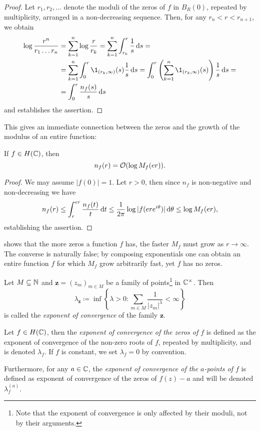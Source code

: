 \begin{proof}
    Let $r_1, r_2, \hdots$ denote the moduli of the zeros of $f$ in $B_{R}(0)$, repeated by multiplicity, arranged in a non-decreasing sequence. Then, for any $r_n < r < r_{n+1}$, we obtain
    \begin{align*}
        \log \frac{r^n}{r_1 \hdots r_n} &= \sum_{k=1}^n \log \frac{r}{r_k} = \sum_{k=1}^n \int_{r_k}^r \frac{1}{s} \diff s = \\
        &= \sum_{k=1}^n \int_0^r \1_{(r_k, \infty)}(s) \frac{1}{s} \diff s = \int_0^r \left( \sum_{k=1}^n \1_{(r_k, \infty)}(s) \right) \frac{1}{s} \diff s = \\
        &= \int_0^r \frac{n_f(s)}{s} \diff s
    \end{align*}
    and  establishes the assertion.
\end{proof}

This gives an immediate connection between the zeros and the growth of the modulus of an entire function:

\begin{lemma} \label{lem:zeros-bounded-by-modulus}
    If $f \in H(\mathbb{C})$, then
    $$ n_f(r) = \mathcal{O}( \log M_f(er) ). $$
\end{lemma}

\begin{proof}
    We may assume $\vert f(0) \vert = 1$. Let $r > 0$, then since $n_f$ is non-negative and non-decreasing we have
    \begin{equation*}
        n_f(r) \leq \int_r^{er} \frac{n_f(t)}{t} \mathop{}\!\mathrm{d} t \leq \frac{1}{2 \pi} \log \vert f(er e^{i \theta}) \vert \mathop{}\!\mathrm{d} \theta \leq \log M_f(er),
    \end{equation*}
    establishing the assertion.
\end{proof}

 shows that the more zeros a function $f$ has, the faster $M_f$ must grow as $r \to \infty$. The converse is naturally false; by composing exponentials one can obtain an entire function $f$ for which $M_f$ grow arbitrarily fast, yet $f$ has no zeros.

\begin{definition} \label{def:zero-exponent}
    Let $M \subseteq \mathbb{N}$ and $\mathbf{z} = (z_m)_{m \in M}$ be a family of points\footnote{Note that the exponent of convergence is only affected by their moduli, not by their arguments.} in $\mathbb{C}^\times$. Then
    $$ \lambda_{\mathbf{z}} \coloneqq \inf \left\{ \lambda > 0 : \sum_{m \in M} \frac{1}{\vert z_m \vert^\lambda} < \infty \right\} $$
    is called the \emph{exponent of convergence} of the family $\mathbf{z}$.

    Let $f \in H(\mathbb{C})$, then the \emph{exponent of convergence of the zeros of $f$} is defined as the exponent of convergence of the non-zero roots of $f$, repeated by multiplicity, and is denoted $\lambda_f$. If $f$ is constant, we set $\lambda_f = 0$ by convention.

    Furthermore, for any $a \in \mathbb{C}$, the \emph{exponent of convergence of the $a$-points of $f$} is defined as exponent of convergence of the zeros of $f(z) - a$ and will be denoted $\lambda_f^{(a)}$.
\end{definition}

